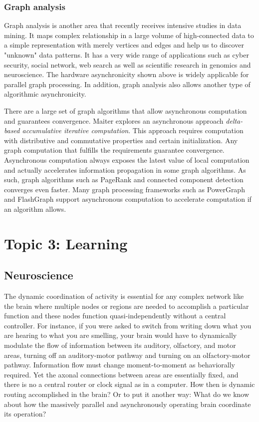 \documentclass[12pt]{report}
\begin{document}
\subsubsection{Graph analysis}
Graph analysis is another area that recently receives intensive studies in
data mining. It maps complex relationship in a large volume of high-connected
data to a simple representation with merely vertices and edges and help us
to discover "unknown" data patterns. It has a very wide range of applications
such as cyber security, social network, web search as well as scientific research
in genomics and neuroscience.
The hardware asynchronicity shown above is widely applicable for parallel graph
processing. In addition, graph analysis also allows another type of algorithmic
asynchronicity.

There are a large set of graph algorithms that allow asynchronous computation
and guarantees convergence. Maiter \cite{maiter} explores an asynchronous approach
{\em delta-based accumulative iterative computation}. This approach requires
computation with distributive and commutative properties and certain initialization.
Any graph computation that fulfills the requirements guarantee convergence.
Asynchronous computation always exposes the latest value of local computation
and actually accelerates information propagation in some graph algorithms.
As such, graph algorithms such as PageRank and connected component detection
converges even faster. Many graph processing frameworks such as PowerGraph
\cite{powergraph} and FlashGraph \cite{flashgraph} support
asynchronous computation to accelerate computation if an algorithm allows.

\section*{Topic 3: Learning}

\subsection{Neuroscience}
The dynamic coordination of activity is essential for any complex network like
the brain where multiple nodes or regions are needed to accomplish a particular
function and these nodes function quasi-independently without a central
controller. For instance, if you were asked to switch from writing down what
you are hearing to what you are smelling, your brain would have to dynamically
modulate the flow of information between its auditory, olfactory, and motor
areas, turning off an auditory-motor pathway and turning on an olfactory-motor
pathway. Information flow must change moment-to-moment as behaviorally required.
Yet the axonal connections between areas are essentially fixed, and there is no
a central router or clock signal as in a computer. How then is dynamic routing
accomplished in the brain? Or to put it another way: What do we know about how
the massively parallel and asynchronously operating brain coordinate its
operation?
\end{document}
